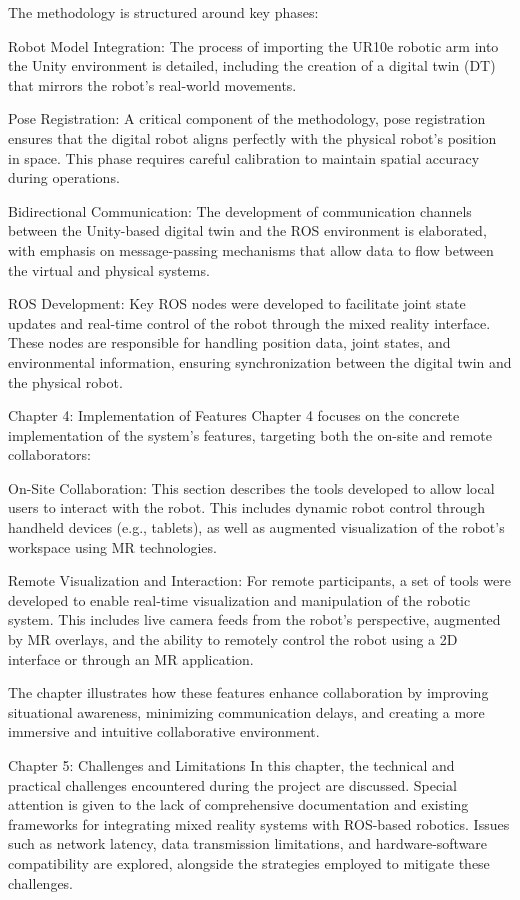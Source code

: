 The methodology is structured around key phases:

Robot Model Integration: The process of importing the UR10e robotic arm into the Unity environment is detailed, including the creation of a digital twin (DT) that mirrors the robot’s real-world movements.

Pose Registration: A critical component of the methodology, pose registration ensures that the digital robot aligns perfectly with the physical robot’s position in space. This phase requires careful calibration to maintain spatial accuracy during operations.

Bidirectional Communication: The development of communication channels between the Unity-based digital twin and the ROS environment is elaborated, with emphasis on message-passing mechanisms that allow data to flow between the virtual and physical systems.

ROS Development: Key ROS nodes were developed to facilitate joint state updates and real-time control of the robot through the mixed reality interface. These nodes are responsible for handling position data, joint states, and environmental information, ensuring synchronization between the digital twin and the physical robot.

Chapter 4: Implementation of Features
Chapter 4 focuses on the concrete implementation of the system’s features, targeting both the on-site and remote collaborators:

On-Site Collaboration: This section describes the tools developed to allow local users to interact with the robot. This includes dynamic robot control through handheld devices (e.g., tablets), as well as augmented visualization of the robot’s workspace using MR technologies.

Remote Visualization and Interaction: For remote participants, a set of tools were developed to enable real-time visualization and manipulation of the robotic system. This includes live camera feeds from the robot’s perspective, augmented by MR overlays, and the ability to remotely control the robot using a 2D interface or through an MR application.

The chapter illustrates how these features enhance collaboration by improving situational awareness, minimizing communication delays, and creating a more immersive and intuitive collaborative environment.

Chapter 5: Challenges and Limitations
In this chapter, the technical and practical challenges encountered during the project are discussed. Special attention is given to the lack of comprehensive documentation and existing frameworks for integrating mixed reality systems with ROS-based robotics. Issues such as network latency, data transmission limitations, and hardware-software compatibility are explored, alongside the strategies employed to mitigate these challenges.

